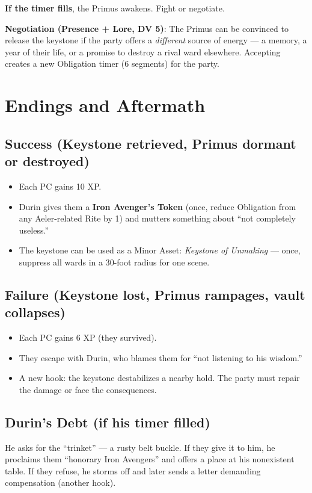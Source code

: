 \documentclass[11pt, a4paper]{article}
\begin{document}
\textbf{If the timer fills}, the Primus awakens. Fight or negotiate.

\textbf{Negotiation (Presence + Lore, DV 5)}: The Primus can be convinced to release the keystone if the party offers a \textit{different} source of energy --- a memory, a year of their life, or a promise to destroy a rival ward elsewhere. Accepting creates a new Obligation timer (6 segments) for the party.

\section{Endings and Aftermath}

\subsection{Success (Keystone retrieved, Primus dormant or destroyed)}
\begin{itemize}
\item Each PC gains 10 XP.
\item Durin gives them a \textbf{Iron Avenger's Token} (once, reduce Obligation from any Aeler-related Rite by 1) and mutters something about ``not completely useless.''
\item The keystone can be used as a Minor Asset: \textit{Keystone of Unmaking} --- once, suppress all wards in a 30-foot radius for one scene.
\end{itemize}

\subsection{Failure (Keystone lost, Primus rampages, vault collapses)}
\begin{itemize}
\item Each PC gains 6 XP (they survived).
\item They escape with Durin, who blames them for ``not listening to his wisdom.''
\item A new hook: the keystone destabilizes a nearby hold. The party must repair the damage or face the consequences.
\end{itemize}

\subsection{Durin's Debt (if his timer filled)}
He asks for the ``trinket'' --- a rusty belt buckle. If they give it to him, he proclaims them ``honorary Iron Avengers'' and offers a place at his nonexistent table. If they refuse, he storms off and later sends a letter demanding compensation (another hook).
\end{document}
